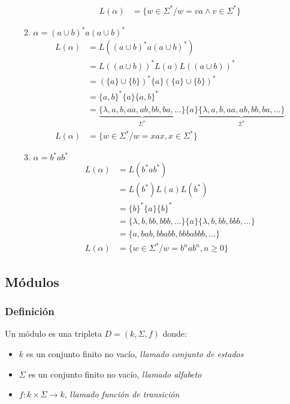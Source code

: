 \begin{itemize}
\begin{enumerate}[label=\alph*)]
\begin{align*}
		L(\alpha ) & = \{ w\in\Sigma^* / w=va \wedge v\in\Sigma^* \}
	\end{align*}
\item $\alpha = (a \cup b)^* a (a \cup b)^*$
	\begin{align*}
		L(\alpha ) & = L( (a\cup b )^* a (a\cup b )^* )\\
			     & = L( (a\cup b) )^* L(a) L((a\cup b))^* \\
			     & = (\{a\} \cup \{ b\})^* \{a\} (\{a\} \cup \{ b\})^*\\
			     & = \{a,b\}^* \{a\} \{a,b\}^* \\
			     & = \underbrace{\{ \lambda,a,b,aa,ab,bb,ba,\ldots \}}_{\Sigma^*} \{a\}  \underbrace{\{ \lambda,a,b,aa,ab,bb,ba,\ldots \}}_{\Sigma^*}\\
		L(\alpha ) & = \{ w\in\Sigma^* / w=xax, x\in\Sigma^* \}
	\end{align*}
\item $\alpha = b^* a b^*$
	\begin{align*}
		L(\alpha ) & = L(b^* a b^*)\\
			     & = L(b^*)L(a) L(b^*)\\
			     & = \{b\}^* \{ a \} \{ b\}^* \\
			     & = \{\lambda,b,bb,bbb,\ldots \} \{ a\} \{\lambda,b,bb,bbb,\ldots \} \\
			     & = \{a,bab,bbabb,bbbabbb,\ldots \} \\
		L(\alpha ) & = \{ w\in\Sigma^* / w = b^n a b^n ,n \geq 0 \}
	\end{align*}
\end{enumerate}
\end{itemize}

\subsection{Módulos}
\subsubsection*{Definición}
Un módulo es una tripleta $D=(k,\Sigma,f)$ donde:
\begin{itemize}
\item $k$ es un conjunto finito no vacío, \textit{llamado conjunto de estados}
\item $\Sigma$ es un conjunto finito no vacío, \textit{llamado alfabeto}
\item $f:k\times\Sigma\rightarrow k$, \textit{llamado función de transición}
\end{itemize}
